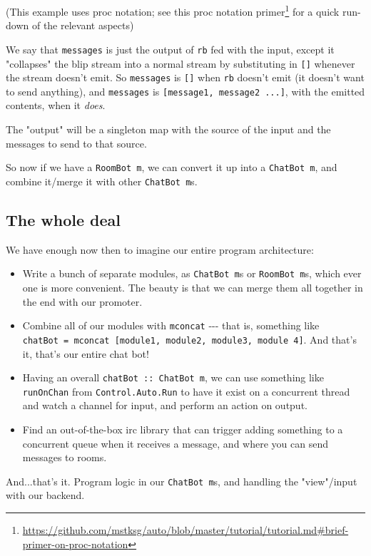 \documentclass[]{article}
\renewcommand{\href}[2]{#2\footnote{\url{#1}}}
\begin{document}
(This example uses proc notation; see this
\href{https://github.com/mstksg/auto/blob/master/tutorial/tutorial.md\#brief-primer-on-proc-notation}{proc
notation primer} for a quick run-down of the relevant aspects)

We say that \texttt{messages} is just the output of \texttt{rb} fed with the
input, except it "collapses" the blip stream into a normal stream by
substituting in \texttt{{[}{]}} whenever the stream doesn't emit. So
\texttt{messages} is \texttt{{[}{]}} when \texttt{rb} doesn't emit (it doesn't
want to send anything), and \texttt{messages} is
\texttt{{[}message1,\ message2\ ...{]}}, with the emitted contents, when it
\emph{does}.

The "output" will be a singleton map with the source of the input and the
messages to send to that source.

So now if we have a \texttt{RoomBot\ m}, we can convert it up into a
\texttt{ChatBot\ m}, and combine it/merge it with other \texttt{ChatBot\ m}s.

\subsection{The whole deal}

We have enough now then to imagine our entire program architecture:

\begin{itemize}
\tightlist
\item
  Write a bunch of separate modules, as \texttt{ChatBot\ m}s or
  \texttt{RoomBot\ m}s, which ever one is more convenient. The beauty is that we
  can merge them all together in the end with our promoter.
\item
  Combine all of our modules with \texttt{mconcat} -\/-\/- that is, something
  like
  \texttt{chatBot\ =\ mconcat\ {[}module1,\ module2,\ module3,\ module\ 4{]}}.
  And that's it, that's our entire chat bot!
\item
  Having an overall \texttt{chatBot\ ::\ ChatBot\ m}, we can use something like
  \texttt{runOnChan} from \texttt{Control.Auto.Run} to have it exist on a
  concurrent thread and watch a channel for input, and perform an action on
  output.
\item
  Find an out-of-the-box irc library that can trigger adding something to a
  concurrent queue when it receives a message, and where you can send messages
  to rooms.
\end{itemize}

And...that's it. Program logic in our \texttt{ChatBot\ m}s, and handling the
"view"/input with our backend.
\end{document}
